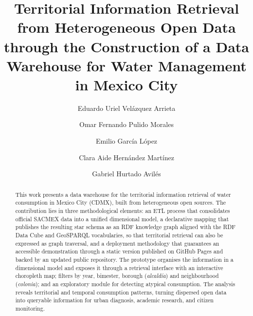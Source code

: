 \documentclass[runningheads]{llncs}
\renewcommand{\_}{\origunderscore\allowbreak}
\newif\ifshowchanges
\newcommand{\new}[1]{\ifshowchanges\textcolor{chg}{#1}\else#1\fi}
\begin{document}
\title{Territorial Information Retrieval from Heterogeneous Open Data through the Construction of a Data Warehouse for Water Management in Mexico City}

\author{%
Eduardo Uriel Vel\'azquez Arrieta \and
Omar Fernando Pulido Morales \and
Emilio Garc\'ia L\'opez \and
Clara Aide Hern\'andez Mart\'inez \and
Gabriel Hurtado Avil\'es%
}


\maketitle

\begin{abstract}
This work presents a data warehouse for the territorial information retrieval of
water consumption in Mexico City (CDMX), built from heterogeneous open sources.
The contribution lies in \new{three} methodological elements: an ETL process that
consolidates official SACMEX data into a unified dimensional model,
\new{a declarative mapping that publishes the resulting star schema as an RDF
knowledge graph aligned with the RDF Data Cube and GeoSPARQL vocabularies, so
that territorial retrieval can also be expressed as graph traversal,} and a
deployment methodology that guarantees an accessible demonstration through a
static version published on GitHub Pages and backed by an updated public
repository. The prototype organises the information in a dimensional model and
exposes it through a retrieval interface with an interactive choropleth map;
filters by year, bimester, borough (\emph{alcald\'ia}) and neighbourhood
(\emph{colonia}); and an exploratory module for detecting atypical consumption.
The analysis reveals territorial and temporal consumption patterns, turning
dispersed open data into queryable information for urban diagnosis, academic
research, and citizen monitoring.
\end{abstract}
\end{document}
